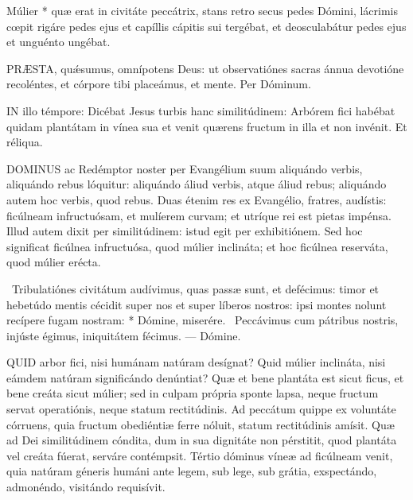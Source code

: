  Múlier * quæ erat in civitáte peccátrix, stans retro secus pedes Dómini, lácrimis cœpit rigáre pedes ejus et capíllis cápitis sui tergébat, et deosculabátur pedes ejus et unguénto ungébat.


\lettrine[lines=2]{P}{RÆSTA}, quǽsumus, omnípotens Deus: ut observatiónes sacras ánnua devotióne recoléntes, et córpore tibi placeámus, et mente. Per Dóminum.





\lettrine[lines=2]{I}{N} illo témpore: Dicébat Jesus turbis hanc similitúdinem: Arbórem fici habébat quidam plantátam in vínea sua et venit quærens fructum in illa et non invénit. Et réliqua.



\lettrine[lines=2]{D}{OMINUS} ac Redémptor noster per Evangélium suum aliquándo verbis, aliquándo rebus lóquitur: aliquándo áliud verbis, atque áliud rebus; aliquándo autem hoc verbis, quod rebus. Duas étenim res ex Evangélio, fratres, audístis: ficúlneam infructuósam, et mulíerem curvam; et utríque rei est pietas impénsa. Illud autem dixit per similitúdinem: istud egit per exhibitiónem. Sed hoc significat ficúlnea infructuósa, quod múlier inclináta; et hoc ficúlnea reserváta, quod múlier erécta.

\R\ Tribulatiónes civitátum audívimus, quas passæ sunt, et defécimus: timor et hebetúdo mentis cécidit super nos et super líberos nostros: ipsi montes nolunt recípere fugam nostram: * Dómine, miserére. \V\ Peccávimus cum pátribus nostris, injúste égimus, iniquitátem fécimus. — Dómine.


\lettrine[lines=2]{Q}{UID} arbor fici, nisi humánam natúram desígnat? Quid múlier inclináta, nisi eámdem natúram significándo denúntiat? Quæ et bene plantáta est sicut ficus, et bene creáta sicut múlier; sed in culpam própria sponte lapsa, neque fructum servat operatiónis, neque statum rectitúdinis. Ad peccátum quippe ex voluntáte córruens, quia fructum obediéntiæ ferre nóluit, statum rectitúdinis amísit. Quæ ad Dei similitúdinem cóndita, dum in sua dignitáte non pérstitit, quod plantáta vel creáta fúerat, serváre contémpsit. Tértio dóminus víneæ ad ficúlneam venit, quia natúram géneris humáni ante legem, sub lege, sub grátia, exspectándo, admonéndo, visitándo requisívit.

